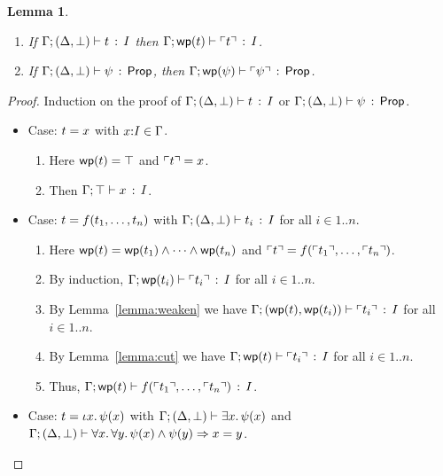 \documentclass[10pt,a4paper]{article}
\newtheorem{lemma}[theorem]{Lemma}
\begin{document}
\clearpage

\begin{lemma}
\label{lemma:l9}
\mbox{}
  \begin{enumerate}
  \item If $\Gamma;(\Delta,\bot) \vdash t\, :\, I$ then
    $\Gamma;\mathop{\mathsf{wp}}(t) \vdash \ulcorner t \urcorner\, :\, I$.
  \item If $\Gamma;(\Delta,\bot) \vdash \psi\, :\, \mathsf{Prop}$, then
    $\Gamma;\mathop{\mathsf{wp}}(\psi) \vdash \ulcorner \psi \urcorner\, :\, \mathsf{Prop}$.
  \end{enumerate}
\end{lemma}

\begin{proof}
  \raggedright Induction on the proof of
  $\Gamma;(\Delta,\bot) \vdash t\, :\, I$ or $\Gamma;(\Delta,\bot) \vdash \psi\, :\, \mathsf{Prop}$.
  \begin{itemize}
  \item Case: $t = x$ with $x{:}I\in\Gamma$.  
    \begin{enumerate}
      \item
        Here $\mathop{\mathsf{wp}}(t) = \top$ and $\ulcorner t \urcorner = x$.
      \item
        Then $\Gamma;\top \vdash x\, :\, I$.
      \end{enumerate}
  \item Case: $t = f({t}_1,\ldots,{t}_{n})$ with
    $\Gamma;(\Delta,\bot) \vdash t_i\, :\, I$ for all $i\in1..n$.
    \begin{enumerate}
    \item
      Here $\mathop{\mathsf{wp}}(t) =
      \mathop{\mathsf{wp}}(t_1) \wedge \cdots \wedge \mathop{\mathsf{wp}}(t_n)$
      and $\ulcorner t \urcorner = f(\ulcorner t_1 \urcorner,\ldots,\ulcorner t_n \urcorner)$.
    \item 
    	By induction,
        $\Gamma;\mathop{\mathsf{wp}}(t_i) \vdash \ulcorner t_i \urcorner\, :\, I$ for
      all $i\in1..n$.  
    \item 
      By Lemma~\ref{lemma:weaken} we have
      $\Gamma;(\mathop{\mathsf{wp}}(t),\mathop{\mathsf{wp}}(t_i)) \vdash \ulcorner t_i \urcorner\, :\, I$
      for all $i\in1..n$.
    \item
      By Lemma~\ref{lemma:cut} we have
      $\Gamma;\mathop{\mathsf{wp}}(t) \vdash \ulcorner t_i \urcorner\, :\, I$ for
      all $i\in1..n$.  
    \item Thus,
      $\Gamma;\mathop{\mathsf{wp}}(t) \vdash f(\ulcorner t_1 \urcorner,\ldots,\ulcorner t_n \urcorner)\, :\, I$.  
    \end{enumerate}
    
  \goodbreak
    
  \item Case: $t = \iota x.\, \psi(x)$ with
  $\Gamma;(\Delta,\bot) \vdash \exists x.\, \psi(x)$ and 
  $\Gamma;(\Delta,\bot) \vdash \forall x.\, \forall y.\, \psi(x) \wedge \psi(y) \Rightarrow x=y$.


\end{itemize}
\end{proof}
\end{document}
